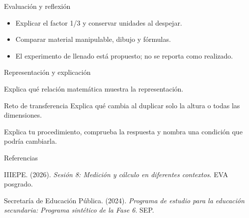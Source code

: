 \documentclass[
	spanish,
	aspectratio=1610,
	xcolor={dvipsnames,table}
]{beamer}
\begin{document}
\begin{frame}{Evaluación y reflexión}
\fontsize{14}{18}\selectfont\begin{itemize}\setlength{\itemsep}{.45cm}
\item Explicar el factor 1/3 y conservar unidades al despejar.
\item Comparar material manipulable, dibujo y fórmulas.
\item El experimento de llenado está propuesto; no se reporta como realizado.
\end{itemize}
\end{frame}
\begin{frame}{Representación y explicación}
\centering{}\par\vspace{.15cm}\small Explica qué relación matemática muestra la representación.
\end{frame}
\begin{frame}{Reto de transferencia}
\fontsize{14}{18}\selectfont Explica qué cambia al duplicar solo la altura o todas las dimensiones.\par\vspace{.5cm}Explica tu procedimiento, comprueba la respuesta y nombra una condición que podría cambiarla.
\end{frame}
\begin{frame}{Referencias}
\fontsize{9}{11}\selectfont\raggedright 
{\setlength{\parskip}{6pt}
\par\hangindent=1.27cm  IIIEPE. (2026). \textit{Sesión 8: Medición y cálculo en diferentes contextos}. EVA posgrado.
\par\hangindent=1.27cm  Secretaría de Educación Pública. (2024). \textit{Programa de estudio para la educación secundaria: Programa sintético de la Fase 6}. SEP.
}


\end{frame}
\end{document}
